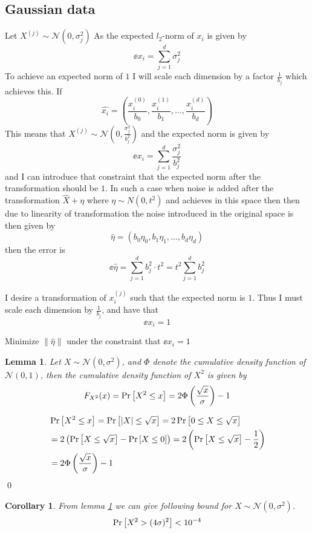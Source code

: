 \documentclass[a4paper,12pt]{article}
\renewenvironment{proof}{{\textit{Proof} \\}}{\qed}
\newtheorem{corollary}{Corollary}[section]
\newtheorem{lemma}{Lemma}[section]
\begin{document}
\subsection{Gaussian data}
Let $X^{(j)} \sim \mathcal{N}(0, \sigma_j^2)$ 
As the expected $l_2$-norm of $x_i$ is given by
\[
    \ee{x_i} = \sum_{j=1}^d \sigma_j^2
\]
To achieve an expected norm of $1$ I will scale 
each dimension by a factor $\frac{1}{b_j}$ which achieves this.
If 
\[
\hat{x_i} = \left( \frac{x_i^{(0)}}{b_0}, \frac{x_i^{(1)}}{b_1}, \dots, \frac{x_i^{(d)}}{b_d} \right)
\]
This means that $X^{(j)} \sim \mathcal{N}(0,\frac{\sigma_j^2}{b_j^2})$ 
and the expected norm is given by 
\[
    \ee{x_i} = \sum_{j=1}^d \frac{\sigma_j^2}{b_j^2}
\]
and I can introduce that constraint that the expected norm
after the transformation should be $1$.
In such a case when noise is added after the transformation
$\hat{X} + \eta$
where $\eta \sim N(0, t^2)$ and achieves \edp in this space
then then due to linearity of transformation the noise 
introduced in the original space is then given by
\[
    \hat{\eta} = \left( b_0\eta_0,b_1\eta_1, \dots, b_d\eta_d \right)
\]
then the error is
\[
    \ee{\hat{\eta}} = \sum_{j=1}^d b_j^2 \cdot t^2 = t^2 \sum_{j=1}^d b_j^2
\] 





I desire a transformation of $x_i^{(j)}$ such that the 
expected norm is $1$. Thus I must scale each dimension by
$\frac{1}{b_j}$, and have that 
\[
    \ee{x_i} = 1
\]

Minimize $\| \hat{\eta} \|$ under the constraint that $\ee{x_i} = 1$  

\begin{lemma}
\label{lem:chibound}
Let $X \sim \mathcal{N}(0,\sigma^2)$, and $\Phi$ denote the 
cumulative density function of $\mathcal{N}(0,1)$, then the 
cumulative density function of $X^2$ is given by
\[
    F_{X^2}(x) = \Pr\left [X^2 \le x \right] = 2\Phi \left (\frac{\sqrt{x}}{\sigma}\right) - 1
\]
\end{lemma}
\begin{proof}
\begin{align*}
    &\Pr\left [X^2 \le x \right] =
    \Pr\left [ |X| \le \sqrt{x} \right] =
    2 \Pr\left [0 \le X \le \sqrt{x} \right]  \\
    & =2  \left (\Pr\left [X \le \sqrt{x} \right] - \Pr\left [X \le 0 \right]\right) =
    2 \left (\Pr\left [X \le \sqrt{x} \right] - \frac{1}{2}\right)  \\
    &= 2 \Phi \left (\frac{\sqrt{x}}{\sigma}\right) - 1 
\end{align*}
\end{proof}
\begin{corollary}
From lemma \ref{lem:chibound} we can give following bound for $X \sim \mathcal{N}(0,\sigma^2)$.
\[
    \Pr\left [X^2 > (4\sigma)^2 \right] < 10^{-4}
\]
\end{corollary}
\end{document}
